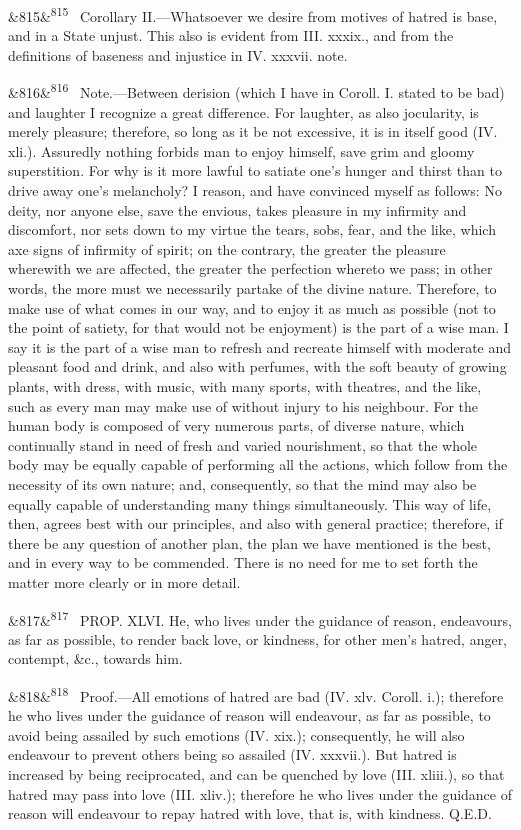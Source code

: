 \documentclass[12pt]{article}
\newcommand{\para}[1][]{\par\noindent\ifx&#1&\else\textsuperscript{\footnotesize #1}~\fi}
\begin{document}
\para[815] Corollary II.---Whatsoever we desire from motives of hatred is base, and in a State unjust. This also is evident from III. xxxix., and from the definitions of baseness and injustice in IV. xxxvii. note.

\para[816] Note.---Between derision (which I have in Coroll. I. stated to be bad) and laughter I recognize a great difference. For laughter, as also jocularity, is merely pleasure; therefore, so long as it be not excessive, it is in itself good (IV. xli.). Assuredly nothing forbids man to enjoy himself, save grim and gloomy superstition. For why is it more lawful to satiate one's hunger and thirst than to drive away one's melancholy? I reason, and have convinced myself as follows: No deity, nor anyone else, save the envious, takes pleasure in my infirmity and discomfort, nor sets down to my virtue the tears, sobs, fear, and the like, which axe signs of infirmity of spirit; on the contrary, the greater the pleasure wherewith we are affected, the greater the perfection whereto we pass; in other words, the more must we necessarily partake of the divine nature. Therefore, to make use of what comes in our way, and to enjoy it as much as possible (not to the point of satiety, for that would not be enjoyment) is the part of a wise man. I say it is the part of a wise man to refresh and recreate himself with moderate and pleasant food and drink, and also with perfumes, with the soft beauty of growing plants, with dress, with music, with many sports, with theatres, and the like, such as every man may make use of without injury to his neighbour. For the human body is composed of very numerous parts, of diverse nature, which continually stand in need of fresh and varied nourishment, so that the whole body may be equally capable of performing all the actions, which follow from the necessity of its own nature; and, consequently, so that the mind may also be equally capable of understanding many things simultaneously. This way of life, then, agrees best with our principles, and also with general practice; therefore, if there be any question of another plan, the plan we have mentioned is the best, and in every way to be commended. There is no need for me to set forth the matter more clearly or in more detail.

\para[817] PROP. XLVI. He, who lives under the guidance of reason, endeavours, as far as possible, to render back love, or kindness, for other men's hatred, anger, contempt, \&c., towards him.

\para[818] Proof.---All emotions of hatred are bad (IV. xlv. Coroll. i.); therefore he who lives under the guidance of reason will endeavour, as far as possible, to avoid being assailed by such emotions (IV. xix.); consequently, he will also endeavour to prevent others being so assailed (IV. xxxvii.). But hatred is increased by being reciprocated, and can be quenched by love (III. xliii.), so that hatred may pass into love (III. xliv.); therefore he who lives under the guidance of reason will endeavour to repay hatred with love, that is, with kindness. Q.E.D.
\end{document}

